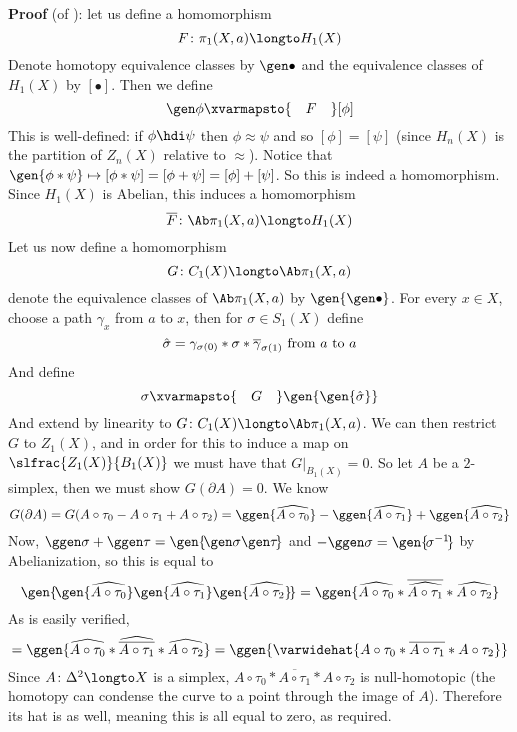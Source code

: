 {\bf Proof} (of ): let us define a homomorphism
$$ F\colon\pi_1(X,a) \longto H_1(X) $$
Denote homotopy equivalence classes by $\gen\bullet$ and the equivalence classes of $H_1(X)$ by $[\bullet]$.
Then we define
$$ \gen\phi\xvarmapsto{\quad F\quad}\relax[\phi] $$
This is well-defined: if $\phi\hdi\psi$ then $\phi\approx\psi$ and so $[\phi]=[\psi]$ (since $H_n(X)$ is the partition of $Z_n(X)$ relative to $\approx$).
Notice that $\gen{\phi*\psi}\mapsto[\phi*\psi]=[\phi+\psi]=[\phi]+[\psi]$.
So this is indeed a homomorphism.
Since $H_1(X)$ is Abelian, this induces a homomorphism
$$ \overline F\colon\Ab\pi_1(X,a)\longto H_1(X) $$
Let us now define a homomorphism
$$ G\colon C_1(X)\longto\Ab\pi_1(X,a) $$
denote the equivalence classes of $\Ab\pi_1(X,a)$ by $\gen{\gen\bullet}$.
For every $x\in X$, choose a path $\gamma_x$ from $a$ to $x$, then for $\sigma\in S_1(X)$ define
$$ \hat\sigma = \gamma_{\sigma(0)}*\sigma*\overline\gamma_{\sigma(1)} \hbox{ from $a$ to $a$} $$
And define
$$ \sigma\xvarmapsto{\quad G\quad}\gen{\gen{\hat\sigma}} $$
And extend by linearity to $G\colon C_1(X)\longto\Ab\pi_1(X,a)$.
We can then restrict $G$ to $Z_1(X)$, and in order for this to induce a map on $\slfrac{Z_1(X)}{B_1(X)}$ we must have that $G\bigl|_{B_1(X)}=0$.
So let $A$ be a $2$-simplex, then we must show $G(\partial A)=0$.
We know
$$ G(\partial A) = G(A\circ\tau_0-A\circ\tau_1+A\circ\tau_2) = \ggen{\widehat{A\circ\tau_0}} - \ggen{\widehat{A\circ\tau_1}} + \ggen{\widehat{A\circ\tau_2}} $$
Now, $\ggen\sigma+\ggen\tau=\gen{\!\gen\sigma\gen\tau\!}$ and $-\ggen\sigma=\gen{\!\sigma^{-1}\!}$ by Abelianization, so this is equal to
$$ \gen{\!\gen{\widehat{A\circ\tau_0}}\gen{\widehat{A\circ\tau_1}}\gen{\widehat{A\circ\tau_2}}\!} = \ggen{\widehat{A\circ\tau_0}*\overline{\widehat{A\circ\tau_1}}*\widehat{A\circ\tau_2}} $$
As is easily verified,
$$ = \ggen{\widehat{A\circ\tau_0}*\widehat{\overline{A\circ\tau_1}}*\widehat{A\circ\tau_2}} = \ggen{\varwidehat{A\circ\tau_0*\overline{A\circ\tau_1}*A\circ\tau_2}} $$
Since $A\colon\Delta^2\longto X$ is a simplex, $A\circ\tau_0*\overline{A\circ\tau_1}*A\circ\tau_2$ is null-homotopic (the homotopy can condense the curve to a point through the image of $A$).
Therefore its hat is as well, meaning this is all equal to zero, as required.

